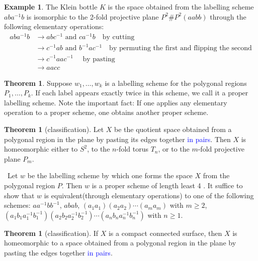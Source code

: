 \documentclass[12pt,a4paper]{book}
\newenvironment{prooff}{{\noindent\it\textcolor{cyan!40!black}{Proof}:}\,}{\par}
\newcommand{\blue}[1]{\textcolor{blue}{#1}}
\theoremstyle{definition}
\newtheorem{theo}[defn]{Theorem}
\newtheorem{exam}[defn]{Example}
\begin{document}
\begin{exam}
    The Klein bottle $K$ is the space obtained from the labelling scheme $a b a^{-1} b$ is isomorphic to the 2-fold projective plane $P^2\# P^2(aabb)$ through
    the following elementary operations:
    $$
        \begin{aligned}
            a b a^{-1} b & \longrightarrow a b c^{-1} \text { and } c a^{-1} b\quad \text{by cutting}                                           \\
                         & \longrightarrow c^{-1} a b \text { and } b^{-1} a c^{-1} \quad \text{by permuting the first and flipping the second} \\
                         & \longrightarrow c^{-1} a a c^{-1}\quad \text{ by pasting}                                                            \\
                         & \longrightarrow aacc
        \end{aligned}
    $$
\end{exam}
\begin{theo}
    Suppose $w_1, \ldots, w_k$ is a labelling scheme for the polygonal regions $P_1, \ldots, P_k$. If each label appears exactly twice in this scheme, we call it a proper labelling scheme. Note the important fact:
    If one applies any elementary operation to a proper scheme, one obtains another proper scheme.
\end{theo}
\begin{theo}[classification]
    Let $X$ be the quotient space obtained from a polygonal region in the plane by pasting its edges together \blue{in pairs}. Then $X$ is homeomorphic either to $S^2$, to the $n$-fold torus $T_n$, or to the $m$-fold projective plane $P_m$.
\end{theo}
\begin{prooff}
    Let $w$ be the labelling scheme by which one forms the space $X$ from the polygonal region $P$.
    Then $w$ is a proper scheme of length least 4 . It suffice to show that $w$ is equivalent(through elementary operations) to one of the following schemes:
    $a a^{-1} b b^{-1}$,
    $a b a b$,
    $\left(a_1 a_1\right)\left(a_2 a_2\right) \cdots\left(a_m a_m\right)$ with $m \geq 2$,
    $\left(a_1 b_1 a_1^{-1} b_1^{-1}\right)\left(a_2 b_2 a_2^{-1} b_2^{-1}\right) \cdots\left(a_n b_n a_n^{-1} b_n^{-1}\right)$ with $n \geq 1$.

\end{prooff}
\begin{theo}[classification]
    If $X$ is a compact connected surface, then $X$ is homeomorphic to a space obtained from a polygonal region in the plane by pasting the edges together \blue{in pairs}.
\end{theo}
\end{document}
